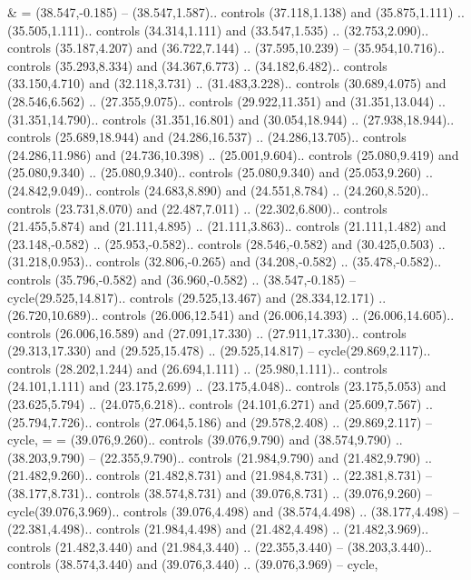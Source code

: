 {&} = {(38.547,-0.185) -- (38.547,1.587).. controls (37.118,1.138) and (35.875,1.111) .. (35.505,1.111).. controls (34.314,1.111) and (33.547,1.535) .. (32.753,2.090).. controls (35.187,4.207) and (36.722,7.144) .. (37.595,10.239) -- (35.954,10.716).. controls (35.293,8.334) and (34.367,6.773) .. (34.182,6.482).. controls (33.150,4.710) and (32.118,3.731) .. (31.483,3.228).. controls (30.689,4.075) and (28.546,6.562) .. (27.355,9.075).. controls (29.922,11.351) and (31.351,13.044) .. (31.351,14.790).. controls (31.351,16.801) and (30.054,18.944) .. (27.938,18.944).. controls (25.689,18.944) and (24.286,16.537) .. (24.286,13.705).. controls (24.286,11.986) and (24.736,10.398) .. (25.001,9.604).. controls (25.080,9.419) and (25.080,9.340) .. (25.080,9.340).. controls (25.080,9.340) and (25.053,9.260) .. (24.842,9.049).. controls (24.683,8.890) and (24.551,8.784) .. (24.260,8.520).. controls (23.731,8.070) and (22.487,7.011) .. (22.302,6.800).. controls (21.455,5.874) and (21.111,4.895) .. (21.111,3.863).. controls (21.111,1.482) and (23.148,-0.582) .. (25.953,-0.582).. controls (28.546,-0.582) and (30.425,0.503) .. (31.218,0.953).. controls (32.806,-0.265) and (34.208,-0.582) .. (35.478,-0.582).. controls (35.796,-0.582) and (36.960,-0.582) .. (38.547,-0.185) -- cycle(29.525,14.817).. controls (29.525,13.467) and (28.334,12.171) .. (26.720,10.689).. controls (26.006,12.541) and (26.006,14.393) .. (26.006,14.605).. controls (26.006,16.589) and (27.091,17.330) .. (27.911,17.330).. controls (29.313,17.330) and (29.525,15.478) .. (29.525,14.817) -- cycle(29.869,2.117).. controls (28.202,1.244) and (26.694,1.111) .. (25.980,1.111).. controls (24.101,1.111) and (23.175,2.699) .. (23.175,4.048).. controls (23.175,5.053) and (23.625,5.794) .. (24.075,6.218).. controls (24.101,6.271) and (25.609,7.567) .. (25.794,7.726).. controls (27.064,5.186) and (29.578,2.408) .. (29.869,2.117) -- cycle},
{=} = {(39.076,9.260).. controls (39.076,9.790) and (38.574,9.790) .. (38.203,9.790) -- (22.355,9.790).. controls (21.984,9.790) and (21.482,9.790) .. (21.482,9.260).. controls (21.482,8.731) and (21.984,8.731) .. (22.381,8.731) -- (38.177,8.731).. controls (38.574,8.731) and (39.076,8.731) .. (39.076,9.260) -- cycle(39.076,3.969).. controls (39.076,4.498) and (38.574,4.498) .. (38.177,4.498) -- (22.381,4.498).. controls (21.984,4.498) and (21.482,4.498) .. (21.482,3.969).. controls (21.482,3.440) and (21.984,3.440) .. (22.355,3.440) -- (38.203,3.440).. controls (38.574,3.440) and (39.076,3.440) .. (39.076,3.969) -- cycle},
